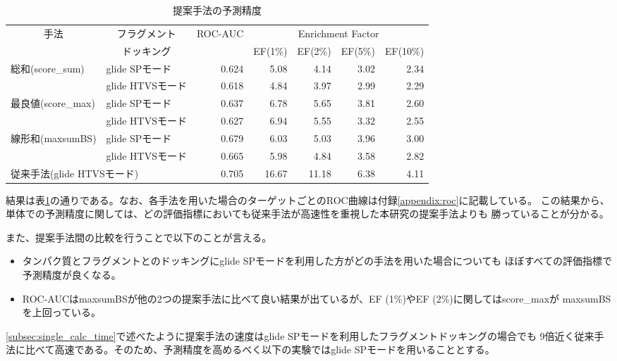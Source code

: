 \begin{table}[htb] \centering
	\caption{提案手法の予測精度}
	\label{table:single_accuracy}
	\begin{tabular}{l|l|rrrrr}
	\hline
	\multicolumn{1}{c|}{\multirow{2}{*}{手法}}	&\multicolumn{1}{c|}{フラグメント}		&\multirow{2}{*}{ROC-AUC}	&\multicolumn{4}{c}{Enrichment Factor}	\\
																	&\multicolumn{1}{c|}{ドッキング}		&						&EF(1\%)	&EF(2\%)	&EF(5\%)	&EF(10\%)	\\ \hline
	\multirow{2}{*}{総和(score\_sum)}		&glide SPモード								&0.624					&5.08	&4.14	&3.02	&2.34		\\
																	&glide HTVSモード							&0.618					&4.84	&3.97	&2.99	&2.29		\\
	\multirow{2}{*}{最良値(score\_max)}		&glide SPモード								&0.637					&6.78	&5.65	&3.81	&2.60		\\
																	&glide HTVSモード							&0.627					&6.94	&5.55	&3.32	&2.55		\\
	\multirow{2}{*}{線形和(maxsumBS)}		&glide SPモード								&0.679					&6.03	&5.03	&3.96	&3.00		\\
																	&glide HTVSモード							&0.665					&5.98	&4.84	&3.58	&2.82		\\ \hline
	\multicolumn{2}{l|}{従来手法(glide HTVSモード)}											&0.705					&16.67	&11.18	&6.38	&4.11		\\ \hline
	\end{tabular}
\end{table}

結果は表\ref{table:single_accuracy}の通りである。なお、各手法を用いた場合のターゲットごとのROC曲線は付録\ref{appendix:roc}に記載している。
この結果から、単体での予測精度に関しては、どの評価指標においても従来手法が高速性を重視した本研究の提案手法よりも
勝っていることが分かる。

また、提案手法間の比較を行うことで以下のことが言える。
\begin{itemize}
\item タンパク質とフラグメントとのドッキングにglide SPモードを利用した方がどの手法を用いた場合についても
	ほぼすべての評価指標で予測精度が良くなる。
\item ROC-AUCはmaxsumBSが他の2つの提案手法に比べて良い結果が出ているが、EF (1\%)やEF (2\%)に関してはscore\_maxが
	maxsumBSを上回っている。
\end{itemize}
\ref{subsec:single_calc_time}で述べたように提案手法の速度はglide SPモードを利用したフラグメントドッキングの場合でも
9倍近く従来手法に比べて高速である。そのため、予測精度を高めるべく以下の実験ではglide SPモードを用いることとする。

